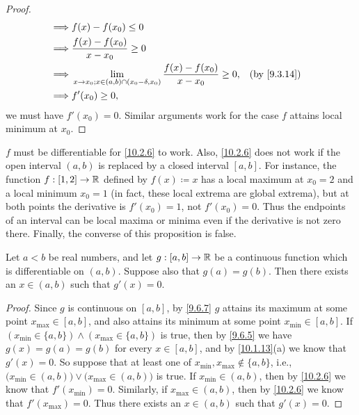 \begin{proof}
\begin{align*}
    \implies & f(x) - f(x_0) \leq 0                                                                                                           \\
    \implies & \dfrac{f(x) - f(x_0)}{x - x_0} \geq 0                                                                                          \\
    \implies & \lim_{x \to x_0 ; x \in (a, b) \cap (x_0 - \delta, x_0)} \dfrac{f(x) - f(x_0)}{x - x_0} \geq 0, &  & \text{(by \cref{9.3.14})} \\
    \implies & f'(x_0) \geq 0,
  \end{align*}
  we must have \(f'(x_0) = 0\).
  Similar arguments work for the case \(f\) attains local minimum at \(x_0\).
\end{proof}

\begin{note}
  \(f\) must be differentiable for \cref{10.2.6} to work.
  Also, \cref{10.2.6} does not work if the open interval \((a, b)\) is replaced by a closed interval \([a, b]\).
  For instance, the function \(f : [1, 2] \to \mathbb{R}\) defined by \(f(x) \coloneqq x\) has a local maximum at \(x_0 = 2\) and a local minimum \(x_0 = 1\) (in fact, these local extrema are global extrema), but at both points the derivative is \(f'(x_0) = 1\), not \(f'(x_0) = 0\).
  Thus the endpoints of an interval can be local maxima or minima even if the derivative is not zero there.
  Finally, the converse of this proposition is false.
\end{note}

\begin{thm}\label{10.2.7}
  Let \(a < b\) be real numbers, and let \(g : [a, b] \to \mathbb{R}\) be a continuous function which is differentiable on \((a, b)\).
  Suppose also that \(g(a) = g(b)\).
  Then there exists an \(x \in (a, b)\) such that \(g'(x) = 0\).
\end{thm}

\begin{proof}
  Since \(g\) is continuous on \([a, b]\), by \cref{9.6.7} \(g\) attains its maximum at some point \(x_{\max} \in [a, b]\), and also attains its minimum at some point \(x_{\min} \in [a, b]\).
  If \((x_{\min} \in \{a, b\}) \land (x_{\max} \in \{a, b\})\) is true, then by \cref{9.6.5} we have \(g(x) = g(a) = g(b)\) for every \(x \in [a, b]\), and by \cref{10.1.13}(a) we know that \(g'(x) = 0\).
  So suppose that at least one of \(x_{\min}, x_{\max} \notin \{a, b\}\), i.e., \(\big(x_{\min} \in (a, b)\big) \lor \big(x_{\max} \in (a, b)\big)\) is true.
  If \(x_{\min} \in (a, b)\), then by \cref{10.2.6} we know that \(f'(x_{\min}) = 0\).
  Similarly, if \(x_{\max} \in (a, b)\), then by \cref{10.2.6} we know that \(f'(x_{\max}) = 0\).
  Thus there exists an \(x \in (a, b)\) such that \(g'(x) = 0\).
\end{proof}

